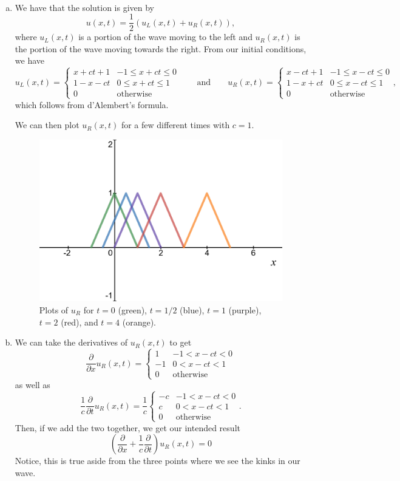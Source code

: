 \documentclass[12pt]{article} %
\begin{document}
\begin{solution}~
\begin{enumerate}[(a)]
    \item We have that the solution is given by
\[
u(x,t) = \frac{1}{2} \left( u_L(x,t) + u_R(x,t)\right),
\]
where $u_L(x,t)$ is a portion of the wave moving to the left and $u_R(x,t)$ is the portion of the wave moving towards the right.  From our initial conditions, we have
\[
u_L(x,t) = \begin{cases} x+ct+1 & -1\leq x+ct \leq 0 \\ 1-x-ct & 0\leq x+ct \leq 1 \\ 0 & \textrm{otherwise} \end{cases} \qquad \textrm{and} \qquad u_R(x,t)=\begin{cases} x-ct+1 & -1\leq x-ct \leq 0 \\ 1-x+ct & 0\leq x-ct \leq 1 \\ 0 & \textrm{otherwise} \end{cases},
\]
which follows from d'Alembert's formula. 

We can then plot $u_R(x,t)$ for a few different times with $c=1$. 
\begin{figure}[H]
    \centering
    \includegraphics[width=.8\textwidth]{figures/right_moving_triangle.png}
    \caption{Plots of $u_R$ for $t=0$ (green), $t=1/2$ (blue), $t=1$ (purple), $t=2$ (red), and $t=4$ (orange).}
\end{figure}
    \item We can take the derivatives of $u_R(x,t)$ to get
    \[
    \frac{\partial}{\partial x} u_R(x,t) = \begin{cases} 1 & -1< x-ct < 0 \\ -1 & 0<x-ct < 1 \\ 0 & \textrm{otherwise} \end{cases}
    \]
    as well as
    \[
    \frac{1}{c}\frac{\partial}{\partial t} u_R(x,t) = \frac{1}{c}\begin{cases} -c & -1< x-ct < 0 \\ c & 0<x-ct < 1 \\ 0 & \textrm{otherwise} \end{cases}.
    \]
    Then, if we add the two together, we get our intended result
    \[
    \left(\frac{\partial}{\partial x} + \frac{1}{c} \frac{\partial}{\partial t} \right)u_R(x,t) = 0
    \]
    Notice, this is true aside from the three points where we see the kinks in our wave.
    

\end{enumerate}
\end{solution}
\end{document}
